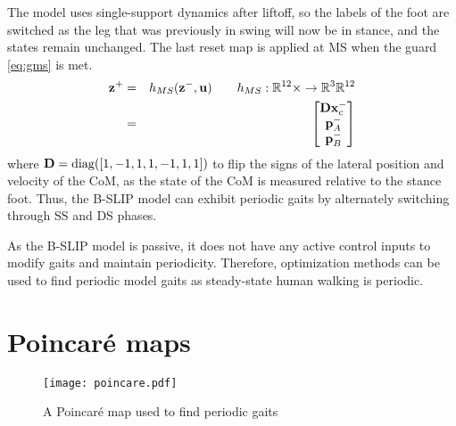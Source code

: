The model uses single-support dynamics after liftoff, so the labels of the foot are switched as the leg that was previously in swing will now be in stance, and the states remain unchanged. The last reset map is applied at MS when the guard \eqref{eq:gms} is met.
%
\begin{eqnarray}
	\mathbf{z}^+ &=& h_{MS}(\mathbf{z}^-,\mathbf{u}) \qquad h_{MS}:\mathbb{R}^{12}\times \rightarrow \mathbb{R}^{3} \mathbb{R}^{12} \\
	{}	&=& \begin{bmatrix}
		\mathbf{D}\mathbf{x}_{c}^- \\
		\mathbf{p}_{A}^- \\
		\mathbf{p}_{B}^-
	\end{bmatrix} \nonumber
\end{eqnarray}
%
%
where $ \mathbf{D} = {\rm diag}([1 ,-1 ,1 ,1 ,-1 ,1 ,1]) $ to flip the signs of the lateral position and velocity of the CoM, as the state of the CoM is measured relative to the stance foot. Thus, the B-SLIP model can exhibit periodic gaits by alternately switching through SS and DS phases.

As the B-SLIP model is passive, it does not have any active control inputs to modify gaits and maintain periodicity. Therefore, optimization methods can be used to find periodic model gaits \cite{strogatz2018nonlinear,garcia1998simplest} as steady-state human walking is periodic. 

\section{Poincar\'e maps}

\begin{figure}
	\centering
	\texttt{[image: poincare.pdf]}
	\caption{A Poincar\'e map used to find periodic gaits}\label{fig:poincare}
\end{figure}

